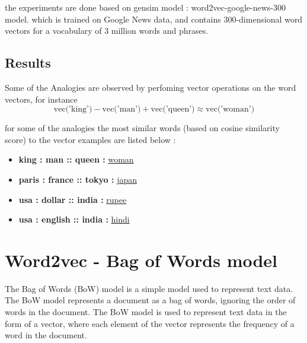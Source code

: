 the experiments are done based on gensim model : word2vec-google-news-300 model.
which is trained on Google News data, and contains 300-dimensional word vectors for a vocabulary of 3 million words and phrases.

\subsection{Results}
Some of the Analogies are observed by perfoming vector operations on the word vectors, for instance 
$$
    \text{vec('king')} - \text{vec('man')} + \text{vec('queen')} \approx \text{vec('woman')}
$$

for some of the analogies the most similar words (based on cosine similarity score) to the vector examples are listed below :

\begin{itemize}
    \item {\bf king : man :: queen : } \underline{ woman }
    \item {\bf paris : france :: tokyo : } \underline{ japan }
    \item {\bf usa : dollar :: india : } \underline{ rupee }
    \item {\bf usa : english :: india : } \underline{ hindi }
\end{itemize}





\section{Word2vec - Bag of Words model}

The Bag of Words (BoW) model is a simple model used to represent text data. The BoW model represents a document as a bag of words, ignoring the order of words in the document. 
The BoW model is used to represent text data in the form of a vector, where each element of the vector represents the frequency of a word in the document.

